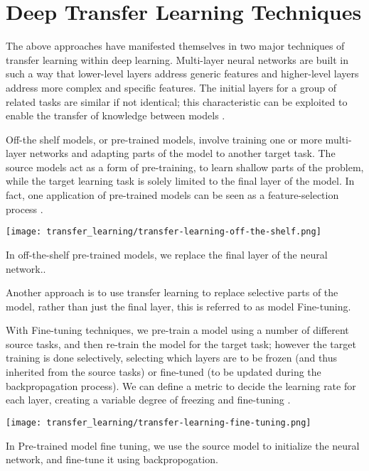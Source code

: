 \section{Deep Transfer Learning Techniques}\label{sec:transfer-learning-deep-techniques}

The above approaches have manifested themselves in two major techniques of transfer learning within deep learning. Multi-layer neural networks are built in such a way that lower-level layers address generic features and higher-level layers address more complex and specific features. The initial layers for a group of related tasks are similar if not identical; this characteristic can be exploited to enable the transfer of knowledge between models \citep{yosinski2014}. 
\newpage


Off-the shelf models, or pre-trained models, involve training one or more multi-layer networks and adapting parts of the model to another target task. The source models act as a form of pre-training, to learn shallow parts of the problem, while the target learning task is solely limited to the final layer of the model. In fact, one application of pre-trained models can be seen as a feature-selection process \citep{zhu2018}. 

\begin{marginfigure}
  \texttt{[image: transfer\_learning/transfer-learning-off-the-shelf.png]}
  \caption{In off-the-shelf pre-trained models, we replace the final layer of the neural network..}
  \label{fig:transferlearning_pretrained_ots}
\end{marginfigure}

Another approach is to use transfer learning to replace selective parts of the model, rather than just the final layer, this is referred to as model Fine-tuning. 

With Fine-tuning techniques, we pre-train a model using a number of different source tasks, and then re-train the model for the target task; however the target training is done selectively, selecting which layers are to be frozen (and thus inherited from the source tasks) or fine-tuned (to be updated during the backpropagation process). We can define a metric to decide the learning rate for each layer, creating a variable degree of freezing and fine-tuning \citep{madhavan2016}. 

\begin{marginfigure}
  \texttt{[image: transfer\_learning/transfer-learning-fine-tuning.png]}
  \caption{In Pre-trained model fine tuning, we use the source model to initialize the neural network, and fine-tune it using backpropogation.}
  \label{fig:transferlearning_pretrained_finetuning}
 
\end{marginfigure}

